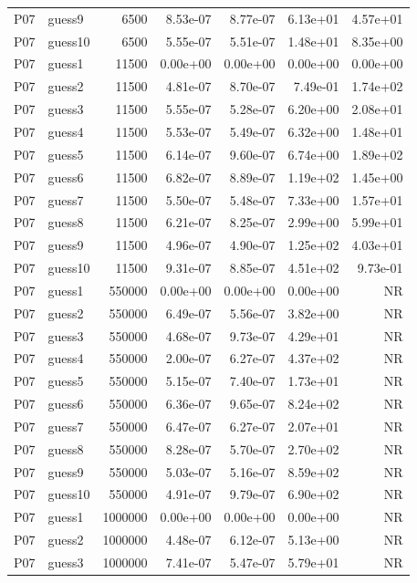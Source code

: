 {\begin{longtable}{llrrrrr}
P07 & guess9 & 6500 & 8.53e-07 & 8.77e-07 & 6.13e+01 & 4.57e+01 \\
P07 & guess10 & 6500 & 5.55e-07 & 5.51e-07 & 1.48e+01 & 8.35e+00 \\
P07 & guess1 & 11500 & 0.00e+00 & 0.00e+00 & 0.00e+00 & 0.00e+00 \\
P07 & guess2 & 11500 & 4.81e-07 & 8.70e-07 & 7.49e-01 & 1.74e+02 \\
P07 & guess3 & 11500 & 5.55e-07 & 5.28e-07 & 6.20e+00 & 2.08e+01 \\
P07 & guess4 & 11500 & 5.53e-07 & 5.49e-07 & 6.32e+00 & 1.48e+01 \\
P07 & guess5 & 11500 & 6.14e-07 & 9.60e-07 & 6.74e+00 & 1.89e+02 \\
P07 & guess6 & 11500 & 6.82e-07 & 8.89e-07 & 1.19e+02 & 1.45e+00 \\
P07 & guess7 & 11500 & 5.50e-07 & 5.48e-07 & 7.33e+00 & 1.57e+01 \\
P07 & guess8 & 11500 & 6.21e-07 & 8.25e-07 & 2.99e+00 & 5.99e+01 \\
P07 & guess9 & 11500 & 4.96e-07 & 4.90e-07 & 1.25e+02 & 4.03e+01 \\
P07 & guess10 & 11500 & 9.31e-07 & 8.85e-07 & 4.51e+02 & 9.73e-01 \\
P07 & guess1 & 550000 & 0.00e+00 & 0.00e+00 & 0.00e+00 & NR \\
P07 & guess2 & 550000 & 6.49e-07 & 5.56e-07 & 3.82e+00 & NR \\
P07 & guess3 & 550000 & 4.68e-07 & 9.73e-07 & 4.29e+01 & NR \\
P07 & guess4 & 550000 & 2.00e-07 & 6.27e-07 & 4.37e+02 & NR \\
P07 & guess5 & 550000 & 5.15e-07 & 7.40e-07 & 1.73e+01 & NR \\
P07 & guess6 & 550000 & 6.36e-07 & 9.65e-07 & 8.24e+02 & NR \\
P07 & guess7 & 550000 & 6.47e-07 & 6.27e-07 & 2.07e+01 & NR \\
P07 & guess8 & 550000 & 8.28e-07 & 5.70e-07 & 2.70e+02 & NR \\
P07 & guess9 & 550000 & 5.03e-07 & 5.16e-07 & 8.59e+02 & NR \\
P07 & guess10 & 550000 & 4.91e-07 & 9.79e-07 & 6.90e+02 & NR \\
P07 & guess1 & 1000000 & 0.00e+00 & 0.00e+00 & 0.00e+00 & NR \\
P07 & guess2 & 1000000 & 4.48e-07 & 6.12e-07 & 5.13e+00 & NR \\
P07 & guess3 & 1000000 & 7.41e-07 & 5.47e-07 & 5.79e+01 & NR \\

\end{longtable}}
